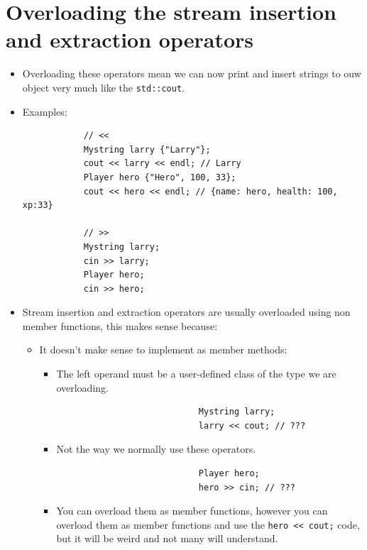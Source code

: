 \section{Overloading the stream insertion and extraction operators}
\begin{itemize}
    \item Overloading these operators mean we can now print and insert strings to ouw object very much like the \texttt{std::cout}.
    \item Examples:
        \begin{verbatim}
            // <<
            Mystring larry {"Larry"};
            cout << larry << endl; // Larry 
            Player hero {"Hero", 100, 33};
            cout << hero << endl; // {name: hero, health: 100, xp:33}

            // >>
            Mystring larry;
            cin >> larry;
            Player hero;
            cin >> hero;
        \end{verbatim}
    
    \item Stream insertion and extraction operators are usually overloaded using non member functions, this makes sense because:
        \begin{itemize}
            \item It doesn't make sense to implement as member methods:
                \begin{itemize}
                    \item The left operand must be a user-defined class of the type we are overloading.
                        \begin{verbatim}
                            Mystring larry;
                            larry << cout; // ???
                        \end{verbatim}
                    \item Not the way we normally use these operators.
                        \begin{verbatim}
                            Player hero;
                            hero >> cin; // ???
                        \end{verbatim}
                    
                    \item You can overload them as member functions, however you can overload them as member functions and use the \texttt{hero << cout;} code, but it will be weird and not many will understand.
                \end{itemize}
        \end{itemize}
    

\end{itemize}
